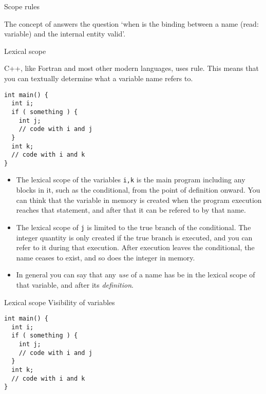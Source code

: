 
 {Scope rules}

The concept of  answers the question `when is the
binding between a name (read: variable) and the internal entity valid'.

 {Lexical scope}

C++, like Fortran and most other modern languages, uses
 rule. This means that you can textually
determine what a variable name refers to.
\begin{lstlisting}
int main() {
  int i;
  if ( something ) {
    int j;
    // code with i and j
  }
  int k;
  // code with i and k
}
\end{lstlisting}
\begin{itemize}
\item The lexical scope of the variables \lstinline{i,k} is the main program
  including any blocks in it, such as the conditional, from the point
  of definition onward. You can think that the variable in memory is
  created when the program execution reaches that statement, and after
  that it can be refered to by that name.
\item The lexical scope of \lstinline{j} is limited to the true branch of the
  conditional. The integer quantity is only created if the true branch
  is executed, and you can refer to it during that execution. After
  execution leaves the conditional, the name ceases to exist, and so
  does the integer in memory.
\item In general you can say that any
  \emph{use}
  of a name has be in the lexical scope of that variable, and after
  its \emph{definition}.
\end{itemize}

\begin{slide}{Lexical scope}
  \label{sl:lexical}
  Visibility of variables
\begin{lstlisting}
int main() {
  int i;
  if ( something ) {
    int j;
    // code with i and j
  }
  int k;
  // code with i and k
}
\end{lstlisting}  
\end{slide}

